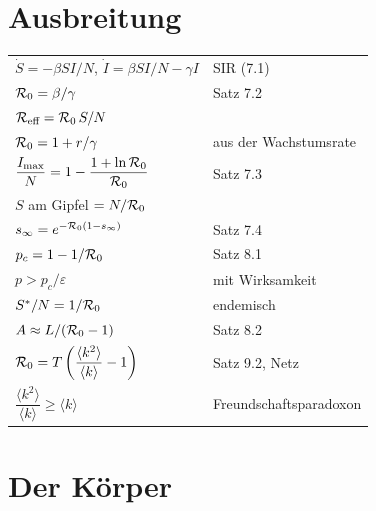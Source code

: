 \section{Ausbreitung}

\begin{merksatz}
\begin{center}
{\small
\renewcommand{\arraystretch}{1.62}
\begin{tabular}{@{}P{4.4cm}P{4.2cm}@{}}
\toprule
$\dot S = -\beta SI/N$, $\dot I = \beta SI/N - \gamma I$ & SIR (7.1)\\
$\mathcal{R}_0 = \beta/\gamma$ & Satz 7.2\\
$\mathcal{R}_{\text{eff}} = \mathcal{R}_0\,S/N$ & \\
$\mathcal{R}_0 = 1 + r/\gamma$ & aus der Wachstumsrate\\
$\dfrac{I_{\max}}{N} = 1-\dfrac{1+\ln\mathcal{R}_0}{\mathcal{R}_0}$ & Satz 7.3\\
$S$ am Gipfel $= N/\mathcal{R}_0$ & \\
$s_\infty = e^{-\mathcal{R}_0(1-s_\infty)}$ & Satz 7.4\\
$p_c = 1-1/\mathcal{R}_0$ & Satz 8.1\\
$p > p_c/\varepsilon$ & mit Wirksamkeit\\
$S^{*}/N = 1/\mathcal{R}_0$ & endemisch\\
$A \approx L/(\mathcal{R}_0-1)$ & Satz 8.2\\
$\mathcal{R}_0 = T\left(\dfrac{\langle k^2\rangle}{\langle k\rangle}-1\right)$ & Satz 9.2, Netz\\
$\dfrac{\langle k^2\rangle}{\langle k\rangle} \ge \langle k\rangle$ & Freundschaftsparadoxon\\
\bottomrule
\end{tabular}}
\end{center}
\end{merksatz}

\section{Der Körper}

